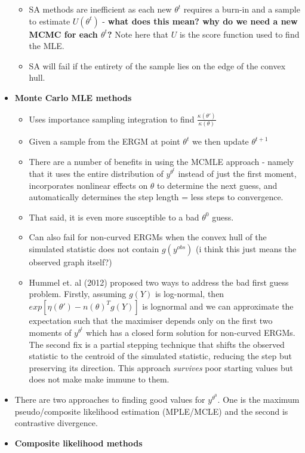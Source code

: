 \begin{itemize}
\begin{itemize}
        \item SA methods are inefficient as each new $\theta^{t}$ requires a burn-in and a sample to estimate $U(\theta^{t})$ - \textbf{what does this mean? why do we need a new MCMC for each $\theta^{t}$?} Note here that $U$ is the score function used to find the MLE.
        \item SA will fail if the entirety of the sample lies on the edge of the convex hull.
    \end{itemize}
    \item \textbf{Monte Carlo MLE methods}
\begin{itemize}
    \item Uses importance sampling integration to find $\frac{\kappa(\theta')}{\kappa(\theta)}$
    \item Given a sample from the ERGM at point $\theta^{t}$ we then update $\theta^{t+1}$
    \item There are a number of benefits in using the MCMLE approach - namely that it uses the entire distribution of $y^{\theta^{t}}$ instead of just the first moment, incorporates nonlinear effects on $\theta$ to determine the next guess, and automatically determines the step length = less steps to convergence.
    \item That said, it is even more susceptible to a bad $\theta^{0}$ guess.
    \item Can also fail for non-curved ERGMs when the convex hull of the simulated statistic does not contain $g(y^{obs})$ (i think this just means the observed graph itself?)
    \item Hummel et. al (2012) proposed two ways to address the bad first guess problem. Firstly, assuming $g(Y)$ is log-normal, then $exp[{\eta(\theta') - n(\theta)}^{T}g(Y)]$ is lognormal and we can approximate the expectation such that the maximiser depends only on the first two moments of $y^{\theta^{t}}$ which has a closed form solution for non-curved ERGMs. The second fix is a partial stepping technique that shifts the observed statistic to the centroid of the simulated statistic, reducing the step but preserving its direction. This approach \emph{survives} poor starting values but does not make make immune to them.
\end{itemize}
    \item There are two approaches to finding good values for $y^{\theta^{0}}$. One is the maximum pseudo/composite likelihood estimation (MPLE/MCLE) and the second is contrastive divergence. 
    \item \textbf{Composite likelihood methods}

\end{itemize}
